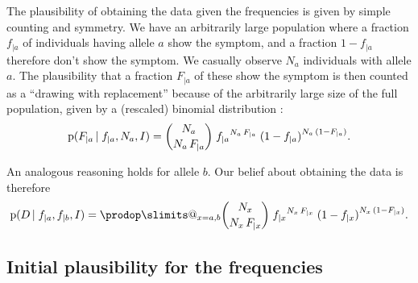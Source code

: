 \documentclass[\ifafour a4paper,12pt,\else a5paper,10pt,\fi%
onecolumn,oneside,article,%
british%
]{memoir}
\makeatletter
\theoremstyle{remark}
\theoremstyle{innote}
\def\prod{\DOTSI\prodop\slimits@}
\newcommand*{\pf}{\mathrm{p}}%
\renewcommand*{\|}[1][]{\nonscript\,#1\vert\nonscript\;\mathopen{}}
\newcommand*{\sect}{\S}%
\newcommand*{\chap}{ch.}%
\newcommand*{\yD}{D}
\newcommand*{\yI}{I}
\newcommand*{\ya}{a}
\newcommand*{\yb}{b}
\makeatother
\begin{document}
The plausibility of obtaining the data given the frequencies is given by
simple counting and symmetry. We have an arbitrarily large population where
a fraction $f_{|\ya}$ of individuals having allele $\ya$ show the symptom,
and a fraction $1- f_{|\ya}$ therefore don't show the symptom. We casually
observe $N_{\ya}$ individuals with allele $\ya$. The plausibility that a
fraction $F_{|\ya}$ of these show the symptom is then counted as a
\enquote{drawing with replacement} because of the arbitrarily large size of
the full population, given by a (rescaled) binomial distribution
\cites[\chap~3]{jaynes1994_r2003}[\sect~4.6]{ross1976_r2010}[\sect~VI.2]{feller1950_r1968}:
\begin{equation}
  \label{eq:sampling_belief}
  \pf( F_{|\ya} \| f_{|\ya},  N_{\ya}, \yI)
  =
\binom{N_{\ya}}{N_{\ya}\,F_{|\ya}}\;  {f_{|\ya}}^{N_{\ya}\,F_{|\ya}} \;
  {(1-f_{|\ya})}^{N_{\ya}\,(1-F_{|\ya})}.
\end{equation}

An analogous reasoning holds for allele $\yb$. Our belief about obtaining
the data is therefore
\begin{equation}
  \label{eq:sampling_belief_combined}
  \pf(\yD \|  f_{|\ya},f_{|\yb}, \yI)
  =
 \prod_{x=\ya,\yb} \binom{N_{x}}{N_{x}\,F_{|x}}\;{f_{|x}}^{N_{x}\,F_{|x}} \;
  {(1-f_{|x})}^{N_{x}\,(1-F_{|x})}.
\end{equation}


\subsection{Initial plausibility for the frequencies}
\label{sec:p_initial}
\end{document}
